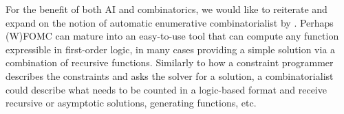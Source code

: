 For the benefit of both AI and combinatorics, we would like to reiterate and
expand on the notion of automatic enumerative combinatorialist by
\citet{DBLP:conf/ilp/BarvinekB0ZK21}. Perhaps (W)FOMC can mature into an
easy-to-use tool that can compute any function expressible in first-order logic,
in many cases providing a simple solution via a combination of recursive
functions. Similarly to how a constraint programmer describes the constraints
and asks the solver for a solution, a combinatorialist could describe what needs
to be counted in a logic-based format and receive recursive or asymptotic
solutions, generating functions, etc.




